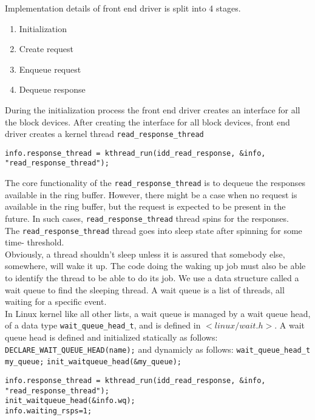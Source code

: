 Implementation details of front end driver is split into 4 stages. 
\begin{enumerate}
\item Initialization
\item Create request
\item Enqueue request 
\item Dequeue response
\end{enumerate}

During the initialization process the front end driver creates an interface for all the block devices. After creating the interface for all block devices, front end driver creates a kernel thread \texttt{read\_response\_thread}
\begin{verbatim}
info.response_thread = kthread_run(idd_read_response, &info, "read_response_thread");
\end{verbatim}
The core functionality of the \texttt{read\_response\_thread} is to dequeue the responses available in the ring buffer. However, there might be a case when no request is available in the ring buffer, but the request is expected to be present in the future. In such cases, \texttt{read\_response\_thread} thread spins for the responses.
\\
The \texttt{read\_response\_thread} thread goes into sleep state after spinning for some time- threshold. 
\\
Obviously, a thread shouldn't sleep unless it is assured that somebody else, somewhere, will wake it up. The code doing the waking up job must also be able to identify the thread to be able to do its job. We use a data structure called a wait queue to find the sleeping thread. A wait queue is a list of threads, all waiting for a specific event\cite{galvin, Bovet:2005:ULK:1077084}.
\\
In Linux kernel like all other lists, a wait queue is managed by a wait queue head, of a data type \texttt{wait\_queue\_head\_t}, and is defined in \texttt{$<linux/wait.h>$}. A wait queue head is defined and initialized statically as follows:
\texttt{DECLARE\_WAIT\_QUEUE\_HEAD(name);}
and dynamicly as follows:
\texttt{wait\_queue\_head\_t my\_queue;}
\texttt{init\_waitqueue\_head(\&my\_queue);}

\begin{verbatim}
info.response_thread = kthread_run(idd_read_response, &info, "read_response_thread");
init_waitqueue_head(&info.wq);
info.waiting_rsps=1;
\end{verbatim}

